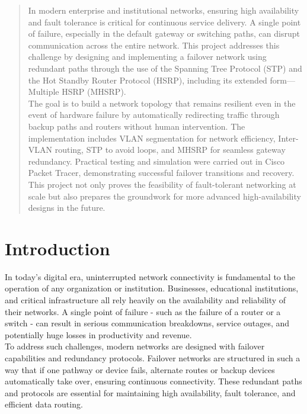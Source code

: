 \documentclass[12pt]{report}
\begin{document}
\begin{abstract}
\thispagestyle{empty}
In modern enterprise and institutional networks, ensuring high availability and fault tolerance is critical for continuous service delivery. A single point of failure, especially in the default gateway or switching paths, can disrupt communication across the entire network. This project addresses this challenge by designing and implementing a failover network using redundant paths through the use of the Spanning Tree Protocol (STP) and the Hot Standby Router Protocol (HSRP), including its extended form—Multiple HSRP (MHSRP).\\

The goal is to build a network topology that remains resilient even in the event of hardware failure by automatically redirecting traffic through backup paths and routers without human intervention. The implementation includes VLAN segmentation for network efficiency, Inter-VLAN routing, STP to avoid loops, and MHSRP for seamless gateway redundancy. Practical testing and simulation were carried out in Cisco Packet Tracer, demonstrating successful failover transitions and recovery. This project not only proves the feasibility of fault-tolerant networking at scale but also prepares the groundwork for more advanced high-availability designs in the future.\\
\end{abstract}
\newpage

\tableofcontents
\thispagestyle{empty}
\clearpage
{}


\chapter{Introduction}

In today’s digital era, uninterrupted network connectivity is fundamental to the operation of any organization or institution. Businesses, educational institutions, and critical infrastructure all rely heavily on the availability and reliability of their networks. A single point of failure - such as the failure of a router or a switch - can result in serious communication breakdowns, service outages, and potentially huge losses in productivity and revenue.\\

To address such challenges, modern networks are designed with failover capabilities and redundancy protocols. Failover networks are structured in such a way that if one pathway or device fails, alternate routes or backup devices automatically take over, ensuring continuous connectivity. These redundant paths and protocols are essential for maintaining high availability, fault tolerance, and efficient data routing.\\
\end{document}
